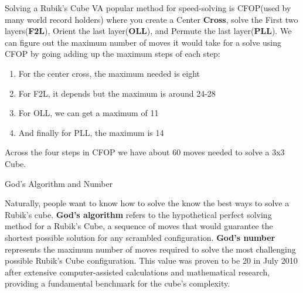 \documentclass[final]{beamer}
\newlength{\colwidth}
\begin{document}
\begin{frame}[t]
\begin{columns}[t]
\begin{column}{\colwidth}
\begin{block}{Solving a Rubik's Cube}
    \large VA popular method for speed-solving is CFOP(used by many world record holders) where you create a Center \textbf{Cross}, solve the First two layers(\textbf{F2L}), Orient the last layer(\textbf{OLL}), and Permute the last layer(\textbf{PLL}). 
    We can figure out the maximum number of moves it would take for a solve using CFOP by going adding up the maximum steps of each step: 
    \begin{enumerate}
      \item For the center cross, the maximum needed is eight
      \item For F2L, it depends but the maximum is around 24-28
      \item For OLL, we can get a maximum of 11
      \item And finally for PLL, the maximum is 14
    \end{enumerate}
    Across the four steps in CFOP we have about 60 moves needed to solve a 3x3 Cube.

  \end{block}

  \begin{block}{God's Algorithm and Number}

    \large Naturally, people want to know how to solve the know the best ways to solve
    a Rubik's cube. \textbf{God's algorithm} refers to the hypothetical perfect solving 
    method for a Rubik's Cube, a sequence of moves that would guarantee the shortest possible 
    solution for any scrambled configuration. \textbf{God's number} represents the maximum 
    number of moves required to solve the most challenging possible Rubik's Cube configuration. 
    This value was proven to be 20 in July 2010 after extensive computer-assisted calculations 
    and mathematical research, providing a fundamental benchmark for the cube's complexity.
    \begin{center}
\end{center}
\end{block}
\end{column}
\end{columns}
\end{frame}
\end{document}
